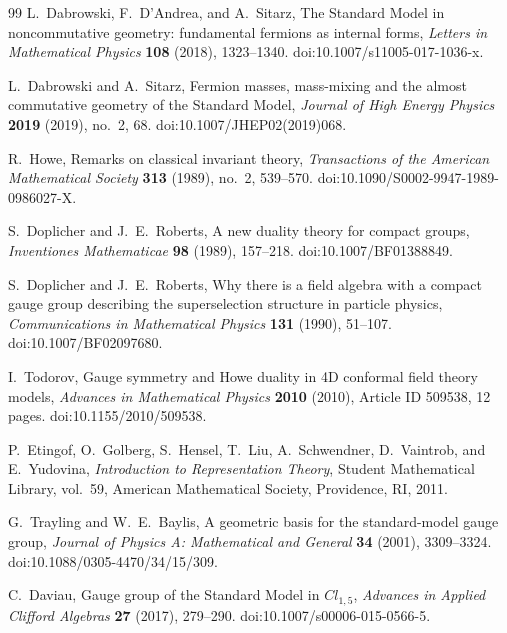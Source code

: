 \documentclass[11pt]{article}
\numberwithin{equation}{section}
\theoremstyle{definition}
\theoremstyle{remark}
\begin{document}
\begin{thebibliography}{99}
L.~Dabrowski, F.~D'Andrea, and A.~Sitarz,
\newblock The Standard Model in noncommutative geometry: fundamental fermions
as internal forms,
\newblock \emph{Letters in Mathematical Physics} \textbf{108} (2018),
1323--1340.
\newblock doi:10.1007/s11005-017-1036-x.

L.~Dabrowski and A.~Sitarz,
\newblock Fermion masses, mass-mixing and the almost commutative geometry of
the Standard Model,
\newblock \emph{Journal of High Energy Physics} \textbf{2019} (2019),
no.~2, 68.
\newblock doi:10.1007/JHEP02(2019)068.

R.~Howe,
\newblock Remarks on classical invariant theory,
\newblock \emph{Transactions of the American Mathematical Society}
\textbf{313} (1989), no.~2, 539--570.
\newblock doi:10.1090/S0002-9947-1989-0986027-X.

S.~Doplicher and J.~E.~Roberts,
\newblock A new duality theory for compact groups,
\newblock \emph{Inventiones Mathematicae} \textbf{98} (1989), 157--218.
\newblock doi:10.1007/BF01388849.

S.~Doplicher and J.~E.~Roberts,
\newblock Why there is a field algebra with a compact gauge group describing
the superselection structure in particle physics,
\newblock \emph{Communications in Mathematical Physics} \textbf{131} (1990),
51--107.
\newblock doi:10.1007/BF02097680.

I.~Todorov,
\newblock Gauge symmetry and Howe duality in 4D conformal field theory models,
\newblock \emph{Advances in Mathematical Physics} \textbf{2010} (2010),
Article ID 509538, 12 pages.
\newblock doi:10.1155/2010/509538.

P.~Etingof, O.~Golberg, S.~Hensel, T.~Liu, A.~Schwendner, D.~Vaintrob, and E.~Yudovina,
\newblock \emph{Introduction to Representation Theory},
\newblock Student Mathematical Library, vol.~59, American Mathematical Society,
Providence, RI, 2011.

G.~Trayling and W.~E.~Baylis,
\newblock A geometric basis for the standard-model gauge group,
\newblock \emph{Journal of Physics A: Mathematical and General} \textbf{34} (2001),
3309--3324.
\newblock doi:10.1088/0305-4470/34/15/309.

C.~Daviau,
\newblock Gauge group of the Standard Model in $Cl_{1,5}$,
\newblock \emph{Advances in Applied Clifford Algebras} \textbf{27} (2017), 279--290.
\newblock doi:10.1007/s00006-015-0566-5.


\end{thebibliography}
\end{document}
